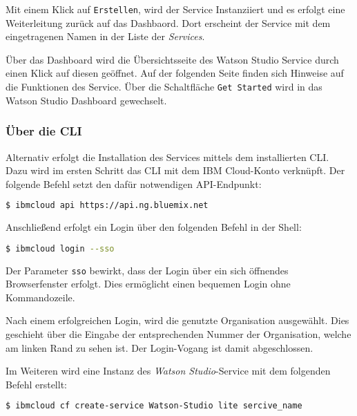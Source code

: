 Mit einem Klick auf \texttt{Erstellen}, wird der Service Instanziiert und es erfolgt eine Weiterleitung zurück auf das
Dashbaord. Dort erscheint der Service mit dem eingetragenen Namen in der Liste der \textit{Services}.

Über das Dashboard wird die Übersichtsseite des Watson Studio Service durch einen Klick auf diesen geöffnet. Auf der
folgenden Seite finden sich Hinweise auf die Funktionen des Service. Über die Schaltfläche \texttt{Get Started} wird in
das Watson Studio Dashboard gewechselt.

\subsubsection*{Über die CLI}
Alternativ erfolgt die Installation des Services mittels dem installierten CLI. Dazu wird im ersten Schritt das CLI mit
dem IBM Cloud-Konto verknüpft. Der folgende Befehl setzt den dafür notwendigen API-Endpunkt:

\begin{lstlisting}[language=bash, caption=Setzen des API Targets, label=Setzen des API Targets]
    $ ibmcloud api https://api.ng.bluemix.net
\end{lstlisting}

Anschließend erfolgt ein Login über den folgenden Befehl in der Shell:

\begin{lstlisting}[language=bash, caption=Login über CLI und Single Sign-on, label=Login über CLI und SSO]
    $ ibmcloud login --sso
\end{lstlisting}

Der Parameter \texttt{sso} bewirkt, dass der Login über ein sich öffnendes Browserfenster erfolgt. Dies ermöglicht einen
bequemen Login ohne Kommandozeile.

Nach einem erfolgreichen Login, wird die genutzte Organisation ausgewählt. Dies geschieht über die Eingabe der
entsprechenden Nummer der Organisation, welche am linken Rand zu sehen ist. Der Login-Vogang ist damit abgeschlossen.

Im Weiteren wird eine Instanz des \textit{Watson Studio}-Service mit dem folgenden Befehl erstellt:

\begin{lstlisting}[language=bash, caption=Instanziierung des Watson Studio Services, label=Instanziierung des Watson Studio Services]
    $ ibmcloud cf create-service Watson-Studio lite sercive_name
\end{lstlisting}

